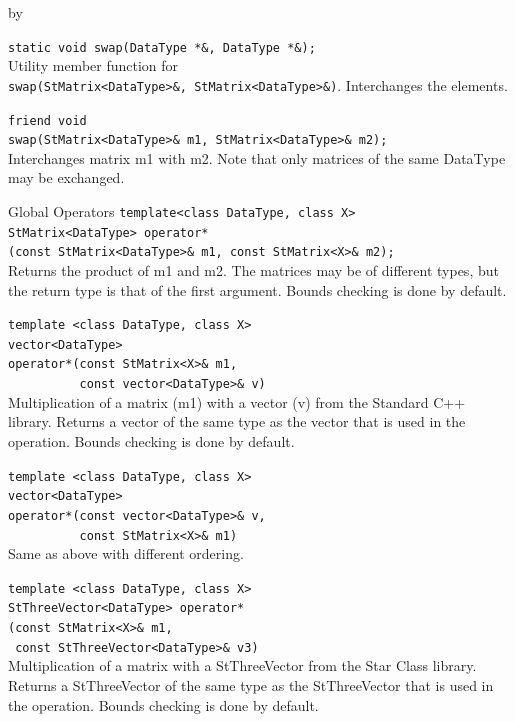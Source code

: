 \documentclass[twoside]{article}
\newcommand{\entrylabel}[1]{\mbox{\textbf{{#1}}}\hfil}%
\newenvironment{entry}
{\begin{list}{}%
    {\renewcommand{\makelabel}{\entrylabel}%
     \setlength{\labelwidth}{90pt}%
     \setlength{\leftmargin}{\labelwidth}
     \advance\leftmargin by \labelsep%
      }%
    }%
  {\end{list}}
\newcommand{\Entrylabel}[1]%
{\raisebox{0pt}[1ex][0pt]{\makebox[\labelwidth][l]%
    {\parbox[t]{\labelwidth}{\hspace{0pt}\textbf{{#1}}}}}}
\newenvironment{Entry}%
{\renewcommand{\entrylabel}{\Entrylabel}\begin{entry}}%
  {\end{entry}}
\begin{document}
\begin{description}
\begin{Entry}
  \verb+static void swap(DataType *&, DataType *&);+\\
  Utility member function for \\
  \verb+swap(StMatrix<DataType>&, StMatrix<DataType>&)+.
  Interchanges the elements.
  
  \verb+friend void+\\
  \verb+swap(StMatrix<DataType>& m1, StMatrix<DataType>& m2);+\\
  Interchanges matrix m1 with m2.  Note that only matrices
  of the same DataType may be exchanged.

\item[Global Operators]
  \verb+template<class DataType, class X>+\\
  \verb+StMatrix<DataType> operator*+\\
  \verb+(const StMatrix<DataType>& m1, const StMatrix<X>& m2);+\\
  Returns the product of m1 and m2.  The matrices may be of different
  types, but the return type is that of the first argument.
  Bounds checking is done by default.
  
  \verb+template <class DataType, class X>+\\
  \verb+vector<DataType>+\\
  \verb+operator*(const StMatrix<X>& m1,+\\
  \verb+          const vector<DataType>& v)+\\
  Multiplication of a matrix (m1) with a vector (v) from the
  Standard C++ library.  Returns a vector of the
  same type as the vector that is used in the operation.
  Bounds checking is done by default.
  
  \verb+template <class DataType, class X>+\\
  \verb+vector<DataType>+\\
  \verb+operator*(const vector<DataType>& v,+\\
  \verb+          const StMatrix<X>& m1)+\\
  Same as above with different ordering.

  \verb+template <class DataType, class X>+\\
  \verb+StThreeVector<DataType> operator*+\\
  \verb+(const StMatrix<X>& m1,+\\
  \verb+ const StThreeVector<DataType>& v3)+\\
  Multiplication of a matrix with a StThreeVector from the
  Star Class library.  Returns a StThreeVector of the
  same type as the StThreeVector that is used in the operation.
  Bounds checking is done by default.


\end{Entry}
\end{description}
\end{document}
